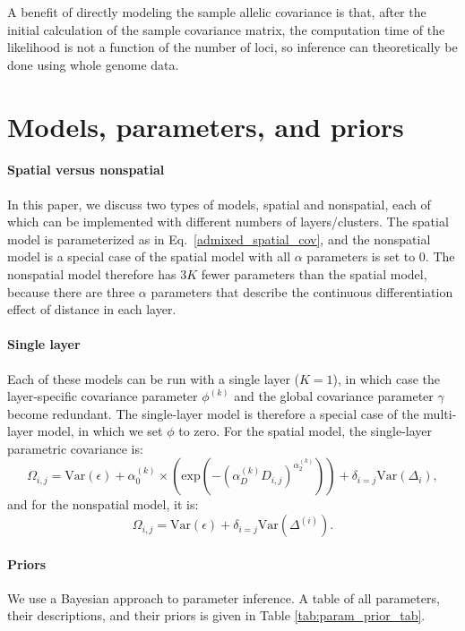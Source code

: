 \documentclass[10pt,letterpaper]{article}
\begin{document}
A benefit of directly modeling the sample allelic covariance is that, 
after the initial calculation of the sample covariance matrix,
the computation time of the likelihood is not a function of the number of loci,
so inference can theoretically be done using whole genome data.


\section*{Models, parameters, and priors}\label{model_app}

\paragraph{Spatial versus nonspatial}
In this paper, we discuss two types of models, spatial and nonspatial, 
each of which can be implemented with different numbers of layers/clusters.
The spatial model is parameterized as in Eq.\ \eqref{admixed_spatial_cov},
and the nonspatial model
is a special case of the spatial model with all $\alpha$ parameters is set to 0.
The nonspatial model therefore has $3K$ fewer parameters than the spatial model,
because there are three $\alpha$ parameters that describe the continuous differentiation effect of distance in each layer.

\paragraph{Single layer}
Each of these models can be run with a single layer ($K=1$), 
in which case the layer-specific covariance parameter $\phi^{(k)}$ 
and the global covariance parameter $\gamma$ become redundant.
The single-layer model is therefore a special case of the multi-layer model, 
in which we set $\phi$ to zero.
For the spatial model, the single-layer parametric covariance is:
\begin{equation}
\Omega_{i,j} = \text{Var}(\epsilon) + 
\alpha^{(k)}_0 \times \left(\text{exp} \left(  -(\alpha^{(k)}_D D_{i,j})^{\alpha^{(k)}_2}\right) \right)	 +
\delta_{i=j} \text{Var}(\Delta_i), 
\label{admixed_continuous_cov}
\end{equation}
and for the nonspatial model, it is:
\begin{equation}
\Omega_{i,j} = \text{Var}(\epsilon) + \delta_{i=j} \text{Var}(\Delta^{(i)}) .
\label{admixed_discrete_covariance}
\end{equation}

\paragraph{Priors}
We use a Bayesian approach to parameter inference.
A table of all parameters, their descriptions, and their priors is given in Table \ref{tab:param_prior_tab}.
\end{document}
